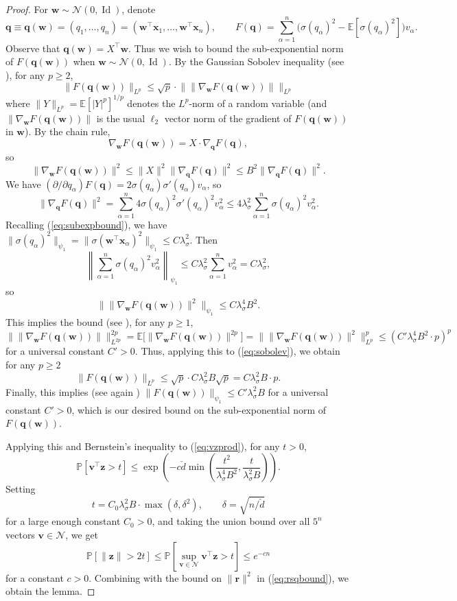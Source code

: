 \documentclass{article}
\theoremstyle{definition}
\newcommand{\N}{\mathcal{N}}
\newcommand{\E}{\mathbb{E}}
\newcommand{\Id}{\operatorname{Id}}
\newcommand{\x}{\mathbf{x}}
\newcommand{\z}{\mathbf{z}}
\renewcommand{\v}{\mathbf{v}}
\newcommand{\w}{\mathbf{w}}
\renewcommand{\r}{\mathbf{r}}
\newcommand{\q}{\mathbf{q}}
\renewcommand{\a}{\alpha}
\newcommand{\vd}{\check{d}}
\renewcommand{\P}{\mathbb{P}}
\newcommand{\1}{\mathbf{1}}
\begin{document}
\begin{proof}
For $\w \sim \N(0,\Id)$, denote
\[\q \equiv \q(\w)=(q_1,\ldots,q_n)=(\w^\top \x_1,\ldots,\w^\top \x_n),
\qquad F(\q)=\sum_{\a=1}^n \Big(\sigma(q_\a)^2
-\E[\sigma(q_\a)^2] \Big)v_\a.\]
Observe that $\q(\w)=X^\top \w$.
Thus we wish to bound the sub-exponential norm of $F(\q(\w))$ when $\w \sim
\N(0,\Id)$. By the Gaussian Sobolev inequality
(see \cite[Eq.\ (3)]{adamczak2015concentration}), for any $p \geq 2$,
\begin{equation}\label{eq:sobolev}
\|F(\q(\w))\|_{L^p} \leq \sqrt{p} \cdot \Big\|\|\nabla_{\w}
F(\q(\w))\|\Big\|_{L^p}
\end{equation}
where $\|Y\|_{L^p}=\E[|Y|^p]^{1/p}$ denotes the $L^p$-norm of a random variable
(and $\|\nabla_\w F(\q(\w))\|$ is the usual $\ell_2$ vector norm of the
gradient of $F(\q(\w))$ in $\w$). By the chain rule,
\[\nabla_{\w} F(\q(\w))=X \cdot \nabla_\q F(\q),\]
so
\[\|\nabla_{\w} F(\q(\w))\|^2 \leq \|X\|^2 \|\nabla_\q F(\q)\|^2
\leq B^2\|\nabla_\q F(\q)\|^2.\]
We have $(\partial/\partial q_\a) F(\q)=2\sigma(q_\a)\sigma'(q_\a)v_\a$, so
\[\|\nabla_\q F(\q)\|^2
=\sum_{\a=1}^n 4\sigma(q_\a)^2\sigma'(q_\a)^2v_\a^2
\leq 4\lambda_\sigma^2 \sum_{\a=1}^n \sigma(q_\a)^2v_\a^2.\]
Recalling (\ref{eq:subexpbound}), we have $\|\sigma(q_\a)^2\|_{\psi_1}
=\|\sigma(\w^\top \x_\a)^2\|_{\psi_1} \leq C\lambda_\sigma^2$. Then
\[\left\|\sum_{\a=1}^n \sigma(q_\a)^2v_\a^2\right\|_{\psi_1}
\leq C\lambda_\sigma^2 \sum_{\a=1}^n v_\a^2=C\lambda_\sigma^2,\]
so
\[\Big\|\|\nabla_{\w} F(\q(\w))\|^2\Big\|_{\psi_1}
\leq C \lambda_\sigma^4B^2.\]
This implies the bound (see \cite[Proposition 2.7.1]{vershynin2018high}),
for any $p \geq 1$,
\[\Big\|\|\nabla_{\w} F(\q(\w))\|\Big\|_{L^{2p}}^{2p}
=\E\Big[\|\nabla_{\w} F(\q(\w))\|^{2p}\Big]
=\Big\|\|\nabla_{\w} F(\q(\w))\|^2\Big\|_{L^p}^p
\leq (C'\lambda_\sigma^4B^2  \cdot p)^p\]
for a universal constant $C'>0$. Thus, applying this to
(\ref{eq:sobolev}), we obtain for any $p \geq 2$
\[\|F(\q(\w))\|_{L^p} \leq \sqrt{p} \cdot C\lambda_\sigma^2B \sqrt{p}
=C\lambda_\sigma^2B \cdot p.\]
Finally, this implies (see again \cite[Proposition 2.7.1]{vershynin2018high})
$\|F(\q(\w))\|_{\psi_1} \leq C'\lambda_\sigma^2B$
for a universal constant $C'>0$, which is our desired bound on the
sub-exponential norm of $F(\q(\w))$.

Applying this and Bernstein's inequality to (\ref{eq:vzprod}), for any $t>0$,
\[\P[\v^\top \z>t]
\leq \exp\left(-c\vd \min\left(\frac{t^2}{\lambda_\sigma^4B^2},
\frac{t}{\lambda_\sigma^2B}\right)\right).\]
Setting
\[t=C_0\lambda_\sigma^2B \cdot \max(\delta,\delta^2),
\qquad \delta=\sqrt{n/\vd}\]
for a large enough constant $C_0>0$, and
taking the union bound over all $5^n$ vectors $\v \in \N$, we get
\[\P[\|\z\|>2t]
\leq \P\left[\sup_{\v \in \N} \v^\top \z>t\right] \leq e^{-cn}\]
for a constant $c>0$. Combining with the bound on $\|\r\|^2$ in
(\ref{eq:rsqbound}), we obtain the lemma.
\end{proof}
\end{document}

